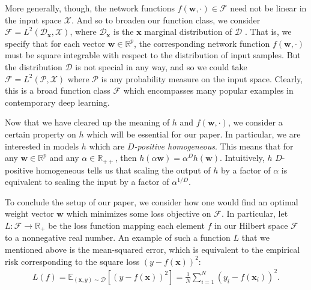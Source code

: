 \documentclass{article}
\begin{document}
More generally, though, the network functions $f(\boldsymbol{w}, \cdot) \in \mathcal{F}$ need not be linear in the input space $\mathcal{X}$. And so to broaden our function class, we consider $\mathcal{F} = L^2(\mathcal{D}_{\boldsymbol{x}}, \mathcal{X})$, where $\mathcal{D}_{\boldsymbol{x}}$ is the $\boldsymbol{x}$ marginal distribution of $\mathcal{D}$ \cite{chizat2018lazy}. That is, we specify that for each vector $\boldsymbol{w} \in \mathbb{R}^p$, the corresponding network function $f(\boldsymbol{w}, \cdot)$ must be square integrable with respect to the distribution of input samples. But the distribution $\mathcal{D}$ is not special in any way, and so we could take $\mathcal{F} = L^2(\mathcal{P}, \mathcal{X})$ where $\mathcal{P}$ is any probability measure on the input space. Clearly, this is a broad function class $\mathcal{F}$ which encompasses many popular examples in contemporary deep learning.

Now that we have cleared up the meaning of $h$ and $f(\boldsymbol{w}, \cdot)$, we consider a certain property on $h$ which will be essential for our paper. In particular, we are interested in models $h$ which are \textit{$D$-positive homogeneous}. This means that for any $\boldsymbol{w} \in \mathbb{R}^p$ and any $\alpha \in \mathbb{R}_{++}$, then $h(\alpha \boldsymbol{w}) = \alpha^D h(\boldsymbol{w})$. Intuitively, $h$ $D$-positive homogeneous tells us that scaling the output of $h$ by a factor of $\alpha$ is equivalent to scaling the input by a factor of $\alpha^{1/D}$.

To conclude the setup of our paper, we consider how one would find an optimal weight vector $\boldsymbol{w}$ which minimizes some loss objective on $\mathcal{F}$. In particular, let $L: \mathcal{F} \rightarrow \mathbb{R}_+$ be the loss function mapping each element $f$ in our Hilbert space $\mathcal{F}$ to a nonnegative real number. An example of such a function $L$ that we mentioned above is the mean-squared error, which is equivalent to the empirical risk corresponding to the square loss $(y - f(\boldsymbol{x}))^2$:
\begin{align}
   L(f) = \mathbb{E}_{(\boldsymbol{x}, y) \sim \mathcal{D}} \left[ \left(y - f(\boldsymbol{x}) \right)^2 \right] = \frac{1}{N}\sum_{i=1}^N (y_i - f(\boldsymbol{x}_i))^2.\label{mse}
\end{align}
\end{document}
